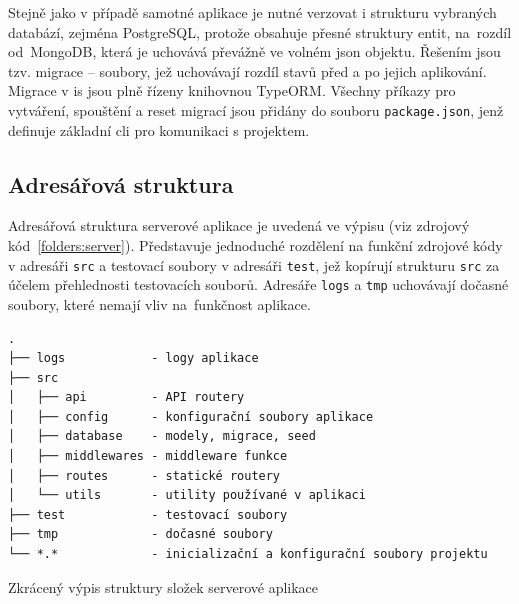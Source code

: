 Stejně jako v případě samotné aplikace je nutné verzovat i strukturu vybraných databází, zejména PostgreSQL, protože obsahuje přesné struktury entit, na~rozdíl od~\mbox{MongoDB}, která je uchovává převážně ve volném \gls{json} objektu. Řešením jsou tzv. migrace -- soubory, jež uchovávají rozdíl stavů před a po jejich aplikování. Migrace v \gls{is} jsou plně řízeny knihovnou TypeORM. Všechny příkazy pro vytváření, spouštění a reset migrací jsou přidány do souboru \texttt{package.json}, jenž definuje základní \gls{cli} pro komunikaci s projektem.





\subsection{Adresářová struktura}

Adresářová struktura serverové aplikace je uvedená ve výpisu (viz zdrojový kód~\ref{folders:server}). Představuje jednoduché rozdělení na funkční zdrojové kódy v adresáři \texttt{src} a testovací soubory v adresáři \texttt{test}, jež kopírují strukturu \texttt{src} za účelem přehlednosti testovacích souborů. Adresáře \texttt{logs} a \texttt{tmp} uchovávají dočasné soubory, které nemají vliv na~funkčnost aplikace.

\begin{fig:code}
   \begin{verbatim}
.
├── logs            - logy aplikace
├── src
│   ├── api         - API routery
│   ├── config      - konfigurační soubory aplikace
│   ├── database    - modely, migrace, seed
│   ├── middlewares - middleware funkce
│   ├── routes      - statické routery
│   └── utils       - utility používané v aplikaci
├── test            - testovací soubory
├── tmp             - dočasné soubory
└── *.*             - inicializační a konfigurační soubory projektu
   \end{verbatim}
   \caption{Zkrácený výpis struktury složek serverové aplikace}\label{folders:server}
\end{fig:code}





